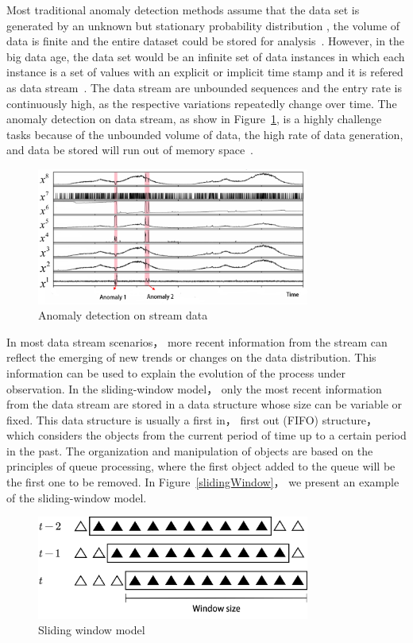 Most traditional anomaly detection methods assume that
the data set is generated
by an unknown but stationary probability distribution
,
the volume of data is finite and
the entire dataset could be stored for analysis~\cite{silva2013data}.
However,
in the big data age,
the data set would be
an infinite set of data instances in which
each instance is a
set of values with an explicit or
implicit time stamp
and it is refered as data stream~\cite{sadik2014research}.
The data stream are unbounded
sequences and the entry rate is continuously high,
as the respective variations repeatedly
change over time.
The anomaly detection on data stream,
as show in Figure~\ref{fig:streamAnomaly},
is a highly challenge tasks because of
the unbounded volume of data,
the high rate of data generation,
and data be stored will run out of memory space~\cite{sadik2014research}.
\begin{figure}
  \centering
  \includegraphics[width=0.8\textwidth]{figures/streamAnomaly.png}
  \caption{Anomaly detection on stream data}\label{fig:streamAnomaly}
\end{figure}

In most data stream scenarios，
more recent information from the stream can reflect the
emerging of new trends or changes on the data distribution.
This information can be
used to explain the evolution of the process under observation.
In the sliding-window model，
only the most recent information
from the data stream are stored in a data structure whose size can be variable
or fixed.
This data structure is usually a first in，
first out (FIFO) structure，
which considers
the objects from the current period of time up to a certain period in the past.
The organization and manipulation of objects are based on the principles of queue processing,
where the first object added to the queue will be the first one to be removed.
In Figure~\ref{slidingWindow}，
we present an example of the sliding-window model.
\begin{figure}
  \centering
  \includegraphics[width=0.8\textwidth]{figures/slideWindow.png}
  \caption{Sliding window model}\label{fig:slidingWindow}
\end{figure}


